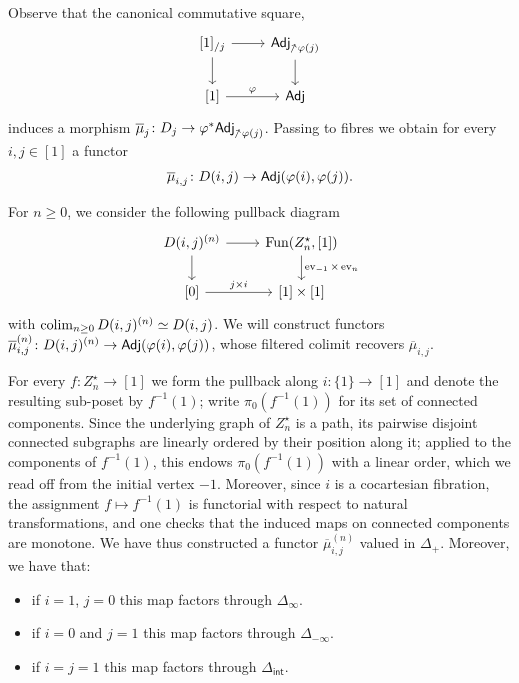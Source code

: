 \documentclass[a4paper,reqno,twoside]{amsart}
\begin{document}
\begin{remark}\label{rem:overlinemu}
	Observe that the canonical commutative square,
	\[
		\begin{tikzcd}
			{[1]_{/j}} \arrow[d] \arrow[r] & \Adj_{\upslash \varphi(j)} \arrow[d] \\
			{[1]} \arrow[r,"\varphi"] & \Adj
		\end{tikzcd}
	\]
	induces a morphism $\overline{\mu}_j \colon D_j \to \varphi^* \Adj_{\upslash \varphi(j)}$. Passing to fibres we obtain for every $i,j \in [1]$ a functor
	\[
		\overline{\mu}_{i,j} \colon D(i,j) \to \mathsf{Adj}(\varphi(i),\varphi(j)).
	\]
\end{remark}

\begin{construction}\label{cons:mucombinatorial}
	For $n \geq 0$, we consider the following pullback diagram
	\[
		\begin{tikzcd}
			D(i,j)^{(n)}  \arrow[r] \arrow[d] & \Fun(Z_n^{\star},[1]) \arrow[d,"\ev_{-1} \times \ev_n"] \\
			{[0]} \arrow[r,"j \times i "] & {[1]\times [1]}
		\end{tikzcd}
	\]
	with $\operatorname*{colim}_{n \geq 0}D(i,j)^{(n)} \simeq D(i,j)$. We will construct functors $\overline{\mu}^{(n)}_{i,j} \colon D(i,j)^{(n)} \to \mathsf{Adj}(\varphi(i),\varphi(j))$, whose filtered colimit recovers $\overline{\mu}_{i,j}$. 
    

	For every $f \colon Z_n^{\star} \to [1]$ we form the pullback along $i \colon \{1\} \to [1]$ and denote the resulting sub-poset by $f^{-1}(1)$; write $\pi_0(f^{-1}(1))$ for its set of connected components. Since the underlying graph of $Z_n^{\star}$ is a path, its pairwise disjoint connected subgraphs are linearly ordered by their position along it; applied to the components of $f^{-1}(1)$, this endows $\pi_0(f^{-1}(1))$ with a linear order, which we read off from the initial vertex $-1$. Moreover, since $i$ is a cocartesian fibration, the assignment $f \mapsto f^{-1}(1)$ is functorial with respect to natural transformations, and one checks that the induced maps on connected components are monotone. We have thus constructed a functor $\overline{\mu}_{i,j}^{(n)}$ valued in $\Delta_{+}$. Moreover, we have that:
	\begin{itemize}
		\item if $i=1$, $j=0$ this map factors through $\Delta_{\infty}$.
		\item if $i=0$ and $j=1$ this map factors through $\Delta_{-\infty}$.
		\item if $i=j=1$ this map factors through $\Delta_{\mathsf{int}}$.
	\end{itemize}
\end{construction}
\end{document}
